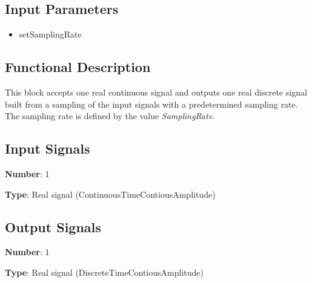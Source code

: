 \documentclass[../../sdf/tex/BPSK_system.tex]{subfiles}
\date{ }
\begin{document}
\onlyinsubfile{\maketitle}

\subsection*{Input Parameters}

\begin{multicols}{2}
	\begin{itemize}
		\item setSamplingRate
	\end{itemize}
\end{multicols}

\subsection*{Functional Description}

This block accepts one real continuous signal and outputs one real discrete signal built from a sampling of the input signals with a predetermined sampling rate. The sampling rate is defined by the value \textit{SamplingRate}.

\subsection*{Input Signals}

\textbf{Number}: 1

\textbf{Type}: Real signal (ContinuousTimeContiousAmplitude)

\subsection*{Output Signals}

\textbf{Number}: 1

\textbf{Type}: Real signal (DiscreteTimeContiousAmplitude)
\end{document}
